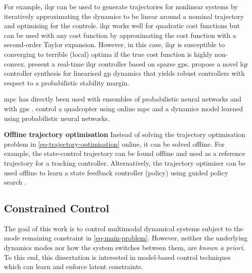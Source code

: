 \documentclass{mimosis-class/mimosis}
\numberwithin{equation}{chapter}
\begin{document}
For example, \acrfull{ilqr} can be used to generate trajectories for nonlinear systems by
iteratively approximating the dynamics to be linear around a nominal trajectory and optimising for the controls.
\acrshort{ilqr} works well for quadratic cost functions but can be used with any cost function by approximating the cost
function with a second-order Taylor expansion.
However, in this case, \acrshort{ilqr} is susceptible to converging
to terrible (local) optima if the true cost function is highly non-convex.
\cite{boedeckerApproximate2014} present a real-time \acrshort{ilqr} controller based on sparse \acrshort{gps}.
\cite{rohrProbabilistic2021} propose a novel \acrshort{lqr} controller synthesis for
linearised \acrshort{gp} dynamics that yields robust controllers with respect to a probabilistic stability margin.

\acrshort{mpc} has directly been used with ensembles of probabilistic neural networks \citep{chuaDeep2018,nagabandiDeep2020}
and with \acrshort{gps} \citep{kamtheDataEfficient2018}.
\cite{lambertLowLevel2019} control a quadcopter using online \acrshort{mpc} and a dynamics model learned using
probabilistic neural networks.

\textbf{Offline trajectory optimisation}
Instead of solving the trajectory optimisation problem in \cref{eq-trajectory-optimisation} online,
it can be solved offline.
For example, the state-control trajectory can be found offline and used as a reference trajectory
for a tracking controller.
Alternatively, the trajectory optimiser can be used offline to learn a state feedback controller (policy)
using guided policy search \citep{levineGuided2013}.

\subsection{Constrained Control}
\label{sec:org7ab5a3d}
The goal of this work is to control multimodal dynamical systems subject to the mode remaining
constraint in \cref{eq-main-problem}.
However, neither the underlying dynamics modes nor how the system switches between them, are \emph{known a priori}.
To this end, this dissertation is interested in model-based control techniques which can
learn and enforce latent constraints.
\end{document}
